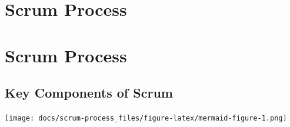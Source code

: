 \documentclass[
  letterpaper,
  DIV=11,
  numbers=noendperiod]{scrreprt}
\begin{document}

\chapter{Scrum Process}\label{scrum-process}


\chapter{Scrum Process}\label{scrum-process-1}

\section{Key Components of Scrum}\label{key-components-of-scrum}

\texttt{[image: docs/scrum-process\_files/figure-latex/mermaid-figure-1.png]}
\end{document}
